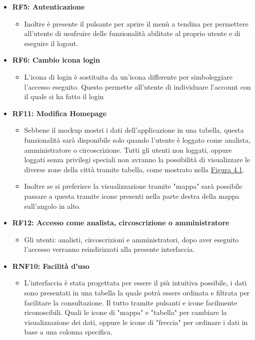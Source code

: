     \begin{itemize}
        \item \textbf{RF5: Autenticazione} \begin{itemize} 
            \item Inoltre è presente il pulsante per aprire il menù a tendina per permettere all'utente di usufruire delle funzionalità abilitate al proprio utente e di eseguire il logout.
        \end{itemize}
        \item \textbf{RF6: Cambio icona login} \begin{itemize} 
            \item L'icona di login è sostituita da un'icona differente per simboleggiare l'accesso eseguito. Questo permette all'utente di individuare l'account con il quale si ha fatto il login
        \end{itemize}
        \item \textbf{RF11: Modifica Homepage} \begin{itemize}
            \item Sebbene il mockup mostri i dati dell'applicazione in una tabella, questa funzionalità sarà disponibile solo quando l'utente è loggato come analista, amministratore o circoscrizione. Tutti gli utenti non loggati, oppure loggati senza privilegi speciali non avranno la possibilità di visualizzare le diverse zone della città tramite tabella, come mostrato nella \hyperref[fig:4.1]{Figura 4.1}.
            \item Inoltre se si preferisce la visualizzazione tramite "mappa" sarà possibile passare a questa tramite icone presenti nella parte destra della mappa sull'angolo in alto. 
        \end{itemize}
        \item \textbf{RF12: Accesso come analista, circoscrizione o amministratore} \begin{itemize}
            \item Gli utenti: analisti, circoscrizioni e amministratori, dopo aver eseguito l'accesso verranno reindirizzati alla presente interfaccia.
        \end{itemize}
        \item \textbf{RNF10: Facilità d'uso} \begin{itemize}
            \item L'interfaccia è stata progettata per essere il più intuitiva possibile, i dati sono presentati in una tabella la quale potrà essere ordinata e filtrata per facilitare la consultazione. Il tutto tramite pulsanti e icone facilmente riconoscibili. Quali le icone di "mappa" e "tabella" per cambiare la visualizzazione dei dati, oppure le icone di "freccia" per ordinare i dati in base a una colonna specifica.

\end{itemize}
\end{itemize}
